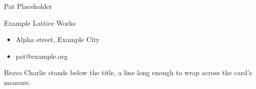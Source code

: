 \documentclass[preset=card]{ltface}
\begin{document}
\begin{frame}
Pat Placeholder

Example Lattice Works

\begin{itemize}
\item Alpha street, Example City
\item pat@example.org
\end{itemize}
\end{frame}
\begin{frame}{Bravo}
Charlie stands below the title, a line long enough to wrap across the card's measure.
\end{frame}
\end{document}
